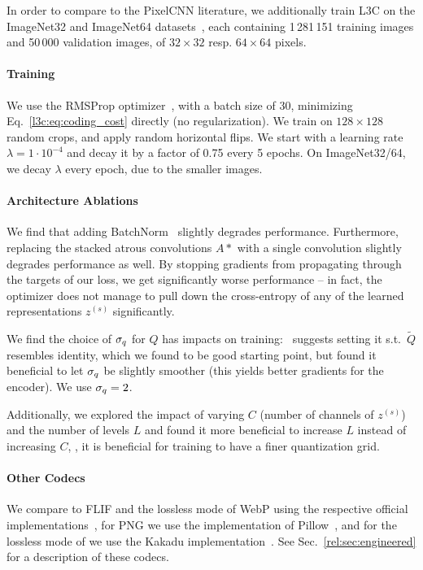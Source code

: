 In order to compare to the PixelCNN literature, we additionally train L3C on the ImageNet32 and ImageNet64 datasets~\cite{chrabaszcz2017downsampled},
each containing  1\,281\,151 training images and 50\,000 validation images, of $32 \times 32$ resp. $64 \times 64$ pixels.

\paragraph{Training} We use the RMSProp optimizer~\cite{hinton2012neural}, with a batch size of 30, minimizing Eq.~\eqref{l3c:eq:coding_cost} directly (no regularization). 
We train on $128 \times 128$ random crops, and apply random horizontal flips.
We start with a learning rate $\lambda=1\cdot10^{-4}$ and decay it by a factor of 0.75 every 5 epochs. 
On ImageNet32/64, we decay $\lambda$ every epoch, due to the smaller images.

\paragraph{Architecture Ablations} We find that adding BatchNorm~\cite{ioffe2015batch} slightly degrades performance. Furthermore, replacing the stacked atrous convolutions $A*$ with a single convolution slightly degrades performance as well. By stopping gradients from propagating through the targets of our loss, we get significantly worse performance -- in fact, the optimizer does not manage to pull down the cross-entropy of any of the learned representations $z^{(s)}$ significantly.

We find the choice of $\sigma_q$ for $Q$ has impacts on training:~\cite{mentzer2018conditional} suggests setting it s.t.\ $\tilde Q$ resembles identity, which we found to be good starting point, but found it beneficial to let $\sigma_q$ be slightly smoother (this yields better gradients for the encoder). We use $\sigma_q=2$.
%

Additionally, we explored the impact of varying $C$ (number of channels of $z^{(s)}$) and the number of levels $L$ and found it more beneficial to increase $L$ instead of increasing $C$, \ie, it is beneficial for training to have a finer quantization grid.

\paragraph{Other Codecs} We compare to FLIF and the lossless mode of WebP using the respective official implementations~\cite{flif2016, webpurl}, for PNG we use the implementation of Pillow~\cite{pillowurl},
and for the lossless mode of \jpegk we use the Kakadu implementation~\cite{kakaduurl}.
See Sec.~\ref{rel:sec:engineered} for a description of these codecs.

